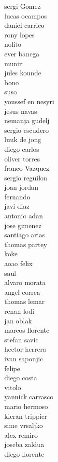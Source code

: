 \documentclass[]{article}
\begin{document}
{sergi Gomez\\
lucas ocampos\\
daniel carrico\\
rony lopes\\
nolito\\
ever banega\\
munir\\
jules kounde\\
bono\\
suso\\
youssef en nesyri\\
jesus navas\\
nemanja gudelj\\
sergio escudero\\
luuk de jong\\
diego carlos\\
oliver torres\\
franco Vazquez\\
sergio reguilon\\
joan jordan\\
fernando\\
javi diaz\\
antonio adan\\
jose gimenez\\
santiago arias\\
thomas partey\\
koke\\
aoao felix\\
saul\\
alvaro morata\\
angel correa\\
thomas lemar\\
renan lodi\\
jan oblak\\
marcos llorente\\
stefan savic\\
hector herrera\\
ivan saponjic\\
felipe\\
diego costa\\
vitolo\\
yannick carrasco\\
mario hermoso\\
kieran trippier\\
sime vrsaljko\\
alex remiro\\
joseba zaldua\\
diego llorente\\
}
\end{document}
